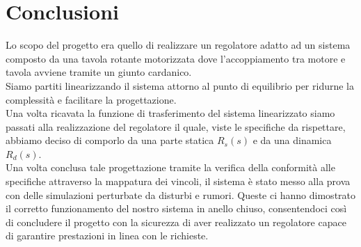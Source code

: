 \documentclass[a4paper, 11pt]{article}
\begin{document}
\section{Conclusioni}

Lo scopo del progetto era quello di realizzare un regolatore adatto ad un sistema composto da una tavola rotante motorizzata dove l’accoppiamento tra motore e tavola avviene tramite un giunto cardanico.\\
Siamo partiti linearizzando il sistema attorno al punto di equilibrio per ridurne la complessità e facilitare la progettazione.\\
Una volta ricavata la funzione di trasferimento del sistema linearizzato siamo passati alla realizzazione del regolatore il quale, viste le specifiche da rispettare, abbiamo deciso di comporlo da una parte statica $R_s(s)$ e da una dinamica $R_d(s)$.\\
Una volta conclusa tale progettazione tramite la verifica della conformità alle specifiche attraverso la mappatura dei vincoli, il sistema è stato messo alla prova con delle simulazioni perturbate da disturbi e rumori. Queste ci hanno dimostrato il corretto funzionamento del nostro sistema in anello chiuso, consentendoci così di concludere il progetto con la sicurezza di aver realizzato un regolatore capace di garantire prestazioni in linea con le richieste.\\
\end{document}
